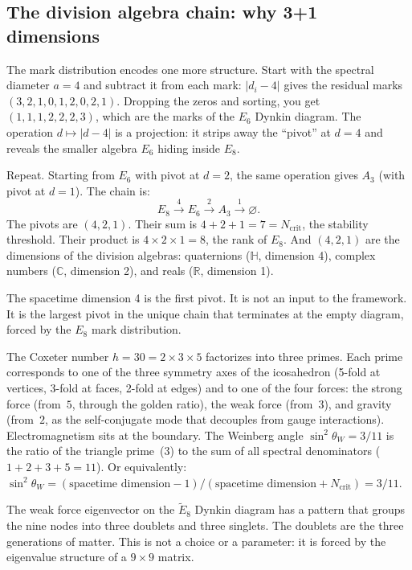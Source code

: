 \subsection*{The division algebra chain: why 3+1 dimensions}

The mark distribution encodes one more structure. Start with the
spectral diameter $a = 4$ and subtract it from each mark:
$|d_i - 4|$ gives the residual marks $(3,2,1,0,1,2,0,2,1)$.
Dropping the zeros and sorting, you get $(1,1,1,2,2,2,3)$, which
are the marks of the $E_6$ Dynkin diagram. The operation
$d \mapsto |d - 4|$ is a projection: it strips away the ``pivot''
at $d = 4$ and reveals the smaller algebra $E_6$ hiding inside $E_8$.

Repeat. Starting from $E_6$ with pivot at $d = 2$, the same
operation gives $A_3$ (with pivot at $d = 1$). The chain is:
\[
  E_8 \xrightarrow{\;4\;} E_6 \xrightarrow{\;2\;} A_3 \xrightarrow{\;1\;} \varnothing.
\]
The pivots are $(4, 2, 1)$. Their sum is $4 + 2 + 1 = 7 = N_{\mathrm{crit}}$,
the stability threshold. Their product is $4 \times 2 \times 1 = 8$,
the rank of $E_8$. And $(4, 2, 1)$ are the dimensions of the
division algebras: quaternions ($\mathbb{H}$, dimension 4),
complex numbers ($\mathbb{C}$, dimension 2), and reals
($\mathbb{R}$, dimension 1).

The spacetime dimension 4 is the first pivot. It is not an input
to the framework. It is the largest pivot in the unique chain that
terminates at the empty diagram, forced by the $E_8$ mark
distribution.

The Coxeter number $h = 30 = 2 \times 3 \times 5$ factorizes into
three primes.  Each prime corresponds to one of the three symmetry axes
of the icosahedron (5-fold at vertices, 3-fold at faces, 2-fold at edges)
and to one of the four forces: the strong force (from~$5$, through the
golden ratio), the weak force (from~$3$), and gravity (from~$2$, as the
self-conjugate mode that decouples from gauge interactions).
Electromagnetism sits at the boundary.
The Weinberg angle $\sin^2\theta_W = 3/11$ is the ratio of the triangle
prime~($3$) to the sum of all spectral denominators
($1 + 2 + 3 + 5 = 11$).  Or equivalently:
$\sin^2\theta_W = (\text{spacetime dimension} - 1)
/ (\text{spacetime dimension} + N_{\mathrm{crit}}) = 3/11$.

The weak force eigenvector on the $\tilde{E}_8$ Dynkin diagram
has a pattern that groups the nine nodes into three doublets
and three singlets.  The doublets are the three generations of matter.
This is not a choice or a parameter: it is forced by the eigenvalue
structure of a $9 \times 9$ matrix.

